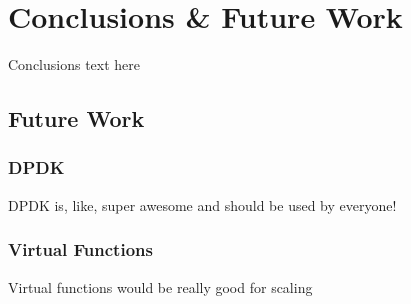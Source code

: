 \chapter{Conclusions \& Future Work}
\label{sec:conclusions}
Conclusions text here


\section{Future Work}
\label{sec:future_work}
\subsection{DPDK}
DPDK is, like, super awesome and should be used by everyone!

\subsection{Virtual Functions}
\label{sec:virtual_functions}
Virtual functions would be really good for scaling

